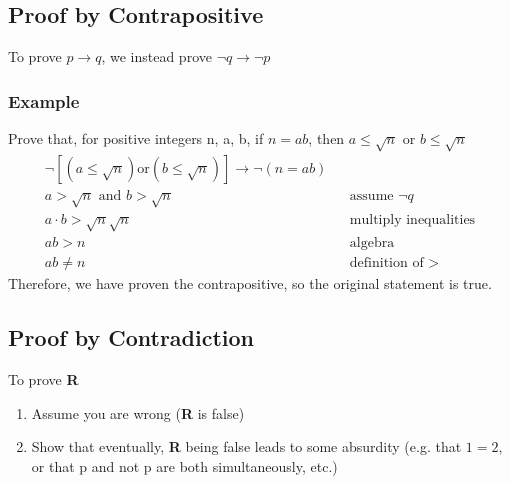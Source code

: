 \documentclass[12pt]{article}
\begin{document}
\subsection{Proof by Contrapositive}
To prove $p \rightarrow q$, we instead prove $\lnot q \rightarrow \lnot p$
\subsubsection{Example}
Prove that, for positive integers n, a, b, if $n = ab$, then $a \leq \sqrt{n}$ or $b \leq \sqrt{n}$
\begin{align*}
	\lnot[(a \leq \sqrt{n}) \text{or} (b \leq \sqrt{n})] \rightarrow \lnot(n = ab) \\
	a > \sqrt{n} \text{ and } b > \sqrt{n} && \text{assume } \lnot q \\
	a \cdot b > \sqrt{n}\sqrt{n} && \text{multiply inequalities}\\
	ab > n && \text{algebra} \\
	ab \neq n && \text{definition of >}
\end{align*}
Therefore, we have proven the contrapositive, so the original statement is true.
\subsection{Proof by Contradiction}
To prove \textbf{R}
\begin{enumerate}
	\item Assume you are wrong (\textbf{R} is false)
	\item Show that eventually, \textbf{R} being false leads to some absurdity (e.g. that $1 = 2$, or that p and not p are both simultaneously, etc.)
\end{enumerate}
\end{document}
